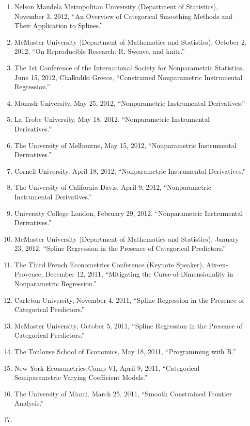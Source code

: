 \documentclass[
]{article}
\begin{document}
\begin{enumerate}
  Predictors.''
\item
  Nelson Mandela Metropolitan University (Department of Statistics),
  November 3, 2012, ``An Overview of Categorical Smoothing Methods and
  Their Application to Splines.''
\item
  McMaster University (Department of Mathematics and Statistics),
  October 2, 2012, ``On Reproducible Research: R, Sweave, and knitr.''
\item
  The 1st Conference of the International Society for Nonparametric
  Statistics, June 15, 2012, Chalkidiki Greece, ``Constrained
  Nonparametric Instrumental Regression.''
\item
  Monash University, May 25, 2012, ``Nonparametric Instrumental
  Derivatives.''
\item
  La Trobe University, May 18, 2012, ``Nonparametric Instrumental
  Derivatives.''
\item
  The University of Melbourne, May 15, 2012, ``Nonparametric
  Instrumental Derivatives.''
\item
  Cornell University, April 18, 2012, ``Nonparametric Instrumental
  Derivatives.''
\item
  The University of California Davis, April 9, 2012, ``Nonparametric
  Instrumental Derivatives.''
\item
  University College London, February 29, 2012, ``Nonparametric
  Instrumental Derivatives.''
\item
  McMaster University (Department of Mathematics and Statistics),
  January 23, 2012, ``Spline Regression in the Presence of Categorical
  Predictors.''
\item
  The Third French Econometrics Conference (Keynote Speaker),
  Aix-en-Provence, December 12, 2011, ``Mitigating the
  Curse-of-Dimensionality in Nonparametric Regression.''
\item
  Carleton University, November 4, 2011, ``Spline Regression in the
  Presence of Categorical Predictors.''
\item
  McMaster University, October 5, 2011, ``Spline Regression in the
  Presence of Categorical Predictors.''
\item
  The Toulouse School of Economics, May 18, 2011, ``Programming with
  R.''
\item
  New York Econometrics Camp VI, April 9, 2011, ``Categorical
  Semiparametric Varying Coefficient Models.''
\item
  The University of Miami, March 25, 2011, ``Smooth Constrained Frontier
  Analysis.''
\item

\end{enumerate}
\end{document}
